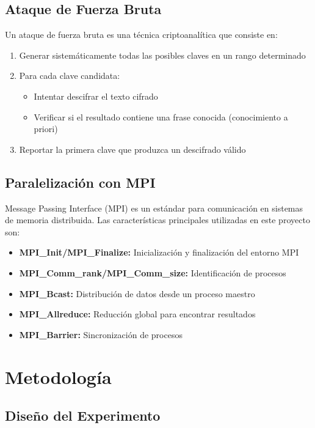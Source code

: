 \documentclass[12pt,letterpaper]{article}
\begin{document}
\subsection{Ataque de Fuerza Bruta}

Un ataque de fuerza bruta es una técnica criptoanalítica que consiste en:

\begin{enumerate}
    \item Generar sistemáticamente todas las posibles claves en un rango determinado
    \item Para cada clave candidata:
    \begin{itemize}
        \item Intentar descifrar el texto cifrado
        \item Verificar si el resultado contiene una frase conocida (conocimiento a priori)
    \end{itemize}
    \item Reportar la primera clave que produzca un descifrado válido
\end{enumerate}

\subsection{Paralelización con MPI}

Message Passing Interface (MPI) es un estándar para comunicación en sistemas de memoria distribuida. Las características principales utilizadas en este proyecto son:

\begin{itemize}
    \item \textbf{MPI\_Init/MPI\_Finalize:} Inicialización y finalización del entorno MPI
    \item \textbf{MPI\_Comm\_rank/MPI\_Comm\_size:} Identificación de procesos
    \item \textbf{MPI\_Bcast:} Distribución de datos desde un proceso maestro
    \item \textbf{MPI\_Allreduce:} Reducción global para encontrar resultados
    \item \textbf{MPI\_Barrier:} Sincronización de procesos
\end{itemize}

\section{Metodología}

\subsection{Diseño del Experimento}
\end{document}
